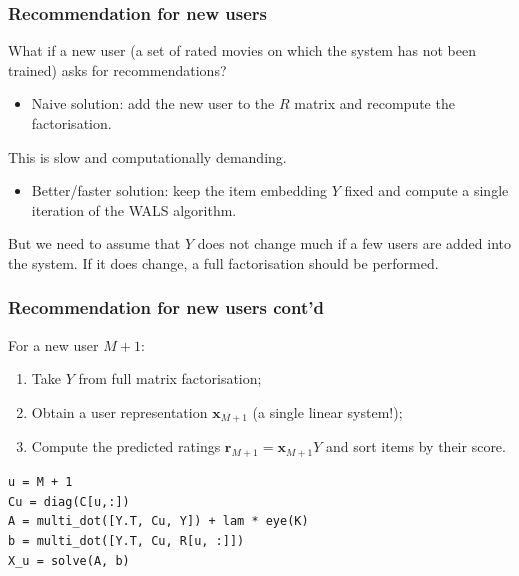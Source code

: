 \documentclass[xcolor = {table}]{beamer}
\begin{document}
  \begin{frame}
    \frametitle{Recommendation for new users}

    What if a new user (a set of rated movies on which the system has not been trained) asks for recommendations?

    \vspace{1em}

    \begin{itemize}
      \item Naive solution: add the new user to the $R$ matrix and recompute the factorisation.
    \end{itemize}

    \vspace{1em}

    This is slow and computationally demanding.

    \vspace{1em}

    \begin{itemize}
      \item Better/faster solution: keep the item embedding $Y$ fixed and compute a single iteration of the WALS algorithm.
    \end{itemize}

    \vspace{1em}

    But we need to assume that $Y$ does not change much if a few users are added into the system. If it does change, a full factorisation should be performed. 

  \end{frame}



  \begin{frame}[fragile]
    \frametitle{Recommendation for new users cont'd}

    For a new user $M + 1$:

    \vspace{0.5em}

    \begin{enumerate}
      \setlength\itemsep{0.5em}
      \item Take $Y$ from full matrix factorisation;
      \item Obtain a user representation $\mathbf{x}_{M+1}$ (a single linear system!);
      \item Compute the predicted ratings $\mathbf{r}_{M+1} = \mathbf{x}_{M+1}Y$ and sort items by their score.
    \end{enumerate}

    \vspace{1em}

    \begin{lstlisting}
u = M + 1
Cu = diag(C[u,:])
A = multi_dot([Y.T, Cu, Y]) + lam * eye(K)
b = multi_dot([Y.T, Cu, R[u, :]])
X_u = solve(A, b)
    \end{lstlisting}

  \end{frame}
\end{document}
